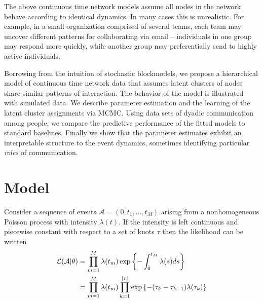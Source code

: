 \documentclass{article}
\begin{document}
The above continuous time network models assume all nodes in the network behave according to identical dynamics.  In many cases this is unrealistic.  For example, in a small organization comprised of several teams, each team may uncover different patterns for collaborating via email --  individuals in one group may respond more quickly, while another group may preferentially send to highly active individuals.  %

Borrowing from the intuition of stochastic blockmodels, we propose a hierarchical model of continuous time network data that assumes latent clusters of nodes share similar patterns of interaction.  The behavior of the model is illustrated with simulated data.  We describe parameter estimation and the learning of the latent cluster assignments via MCMC.  Using data sets of dyadic communication among people, we compare the predictive performance of the fitted models to standard baselines.  Finally we show that the parameter estimates exhibit an interpretable structure to the event dynamics, sometimes identifying particular \emph{roles} of communication.
  
\section{Model}

Consider a sequence of events $\mathcal{A} = (0,t_1, \ldots, t_M)$ arising from a nonhomogeneous Poisson process with  intensity $\lambda(t)$.  If the intensity is left continuous and piecewise constant with respect to a set of knots $\tau$ then the likelihood can be written
\begin{align}
\mathcal{L}(\mathcal{A}|\theta) &= \prod_{m=1}^M \lambda(t_m) \exp\left\{ - \int_{0}^{t_M} \lambda(s)ds \right\} \notag  \\
&= \prod_{m=1}^M \lambda(t_m) \prod_{k=1}^{|\tau|} \exp\left\{ - (\tau_{k} - \tau_{k-1}) \lambda(\tau_k) \right\}%
\end{align}
\end{document}
